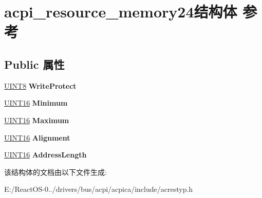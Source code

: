 \hypertarget{structacpi__resource__memory24}{}\section{acpi\+\_\+resource\+\_\+memory24结构体 参考}
\label{structacpi__resource__memory24}
\subsection*{Public 属性}
\begin{DoxyCompactItemize}
\item 
\mbox{\label{structacpi__resource__memory24_ae09700f112b875bdcbb7e7742ce59f39}} 
\hyperlink{_processor_bind_8h_ab27e9918b538ce9d8ca692479b375b6a}{U\+I\+N\+T8} {\bfseries Write\+Protect}
\item 
\mbox{\label{structacpi__resource__memory24_af93e99ba8ec534f43586012b012cdd9d}} 
\hyperlink{_processor_bind_8h_a09f1a1fb2293e33483cc8d44aefb1eb1}{U\+I\+N\+T16} {\bfseries Minimum}
\item 
\mbox{\label{structacpi__resource__memory24_ac7bedb36e00430770e0888883f8b7d39}} 
\hyperlink{_processor_bind_8h_a09f1a1fb2293e33483cc8d44aefb1eb1}{U\+I\+N\+T16} {\bfseries Maximum}
\item 
\mbox{\label{structacpi__resource__memory24_a0459b10dc7c5aad1c9bf490ff98285ab}} 
\hyperlink{_processor_bind_8h_a09f1a1fb2293e33483cc8d44aefb1eb1}{U\+I\+N\+T16} {\bfseries Alignment}
\item 
\mbox{\label{structacpi__resource__memory24_a12d16a6958ceb563948a088fc8522865}} 
\hyperlink{_processor_bind_8h_a09f1a1fb2293e33483cc8d44aefb1eb1}{U\+I\+N\+T16} {\bfseries Address\+Length}
\end{DoxyCompactItemize}


该结构体的文档由以下文件生成\+:\begin{DoxyCompactItemize}
\item 
E\+:/\+React\+O\+S-\/0../drivers/bus/acpi/acpica/include/acrestyp.\+h\end{DoxyCompactItemize}
